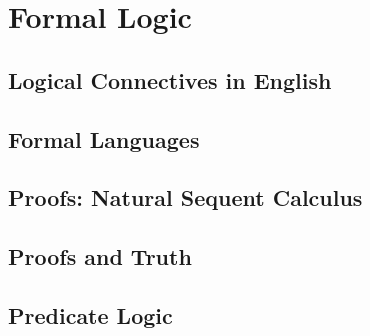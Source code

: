 \part{Formal Logic}

\chapter{Logical Connectives in English}\label{ch:NaturalLanguage}


\chapter{Formal Languages}\label{ch:FormalLanguages}


\chapter{Proofs: Natural Sequent Calculus}\label{ch:SequentCalculus}


\chapter{Proofs and Truth}\label{ch:ProofsTruth}


\chapter{Predicate Logic}\label{ch:PredicateLogic} 


